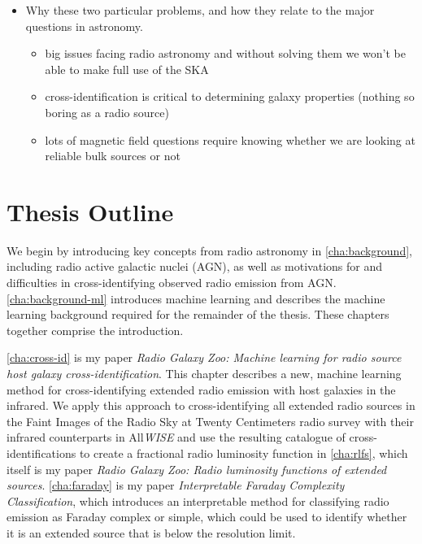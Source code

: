 \begin{itemize}
\begin{itemize}
        \item 
    \end{itemize}
    \item Why these two particular problems, and how they relate to the major questions in astronomy. \begin{itemize}
        \item big issues facing radio astronomy and without solving them we won't be able to make full use of the SKA
        \item cross-identification is critical to determining galaxy properties (nothing so boring as a radio source)
        \item lots of magnetic field questions require knowing whether we are looking at reliable bulk sources or not
    \end{itemize}
\end{itemize}


\section{Thesis Outline}
\label{sec:outline}

We begin by introducing key concepts from radio astronomy in \autoref{cha:background}, including radio active galactic nuclei (AGN), as well as motivations for and difficulties in cross-identifying observed radio emission from AGN. \autoref{cha:background-ml} introduces machine learning and describes the machine learning background required for the remainder of the thesis. These chapters together comprise the introduction.

\autoref{cha:cross-id} is my paper \emph{Radio Galaxy Zoo: Machine learning for radio source host galaxy cross-identification}. This chapter describes a new, machine learning method for cross-identifying extended radio emission with host galaxies in the infrared. We apply this approach to cross-identifying all extended radio sources in the Faint Images of the Radio Sky at Twenty Centimeters radio survey \citep[FIRST;][]{becker95first} with their infrared counterparts in All\emph{WISE} \citep{cutri2013wiseexplanatory} and use the resulting catalogue of cross-identifications to create a fractional radio luminosity function in \autoref{cha:rlfs}, which itself is my paper \emph{Radio Galaxy Zoo: Radio luminosity functions of extended sources}. \autoref{cha:faraday} is my paper \emph{Interpretable Faraday Complexity Classification}, which introduces an interpretable method for classifying radio emission as Faraday complex or simple, which could be used to identify whether it is an extended source that is below the resolution limit.

